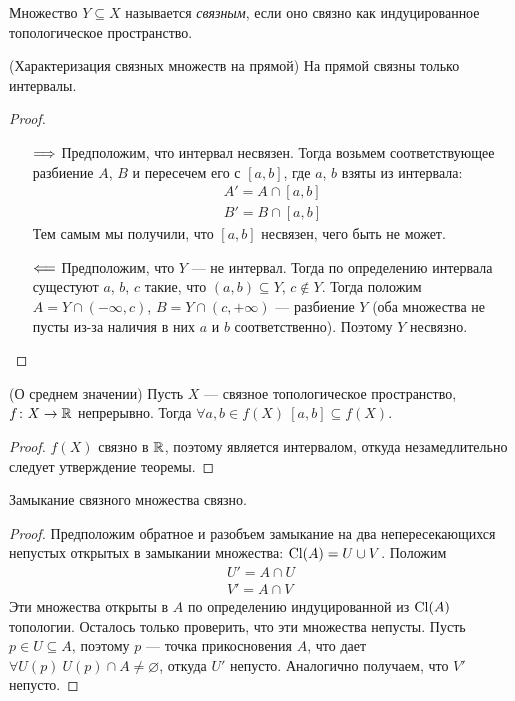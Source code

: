 \begin{definition}
	Множество $Y \subseteq X$ называется \textit{связным}, если оно связно как
	индуцированное топологическое пространство.
\end{definition}

\begin{theorem}(Характеризация связных множеств на прямой)
	На прямой связны только интервалы.
\end{theorem}
\begin{proof}
	\enewline
	\begin{itemize}
		\item[$\Longrightarrow$] Предположим, что интервал несвязен. Тогда
			возьмем соответствующее разбиение $A$, $B$ и пересечем его с
			$[a, b]$, где $a$, $b$ взяты из интервала:
\begin{align*}
	A' = A \cap [a, b] \\
	B' = B \cap [a, b]
\end{align*}
			Тем самым мы получили, что $[a, b]$ несвязен, чего быть не может.
		\item[$\Longleftarrow$] Предположим, что $Y$ --- не интервал. Тогда по определению
			интервала сущестуют $a$, $b$, $c$ такие, что $(a, b) \subseteq Y$, $c \notin Y$.
			Тогда положим $A = Y \cap (-\infty, c)$, $B = Y \cap (c, +\infty)$ --- разбиение
			$Y$ (оба множества не пусты из-за наличия в них $a$ и $b$ соответственно). 
			Поэтому $Y$ несвязно.
	\end{itemize}
\end{proof}

\begin{theorem}(О среднем значении)
	Пусть $X$ --- связное топологическое пространство, $f \colon X \to \mathbb{R}$ непрерывно.
	Тогда $\forall a, b \in f(X)~ [a, b] \subseteq f(X)$.
\end{theorem}
\begin{proof}
	$f(X)$ связно в $\mathbb{R}$, поэтому является интервалом, откуда незамедлительно
	следует утверждение теоремы.
\end{proof}

\begin{lemma}
	Замыкание связного множества связно.
\end{lemma}
\begin{proof}
	Предположим обратное и разобъем замыкание на два непересекающихся непустых
	открытых в замыкании множества: $\operatorname{Cl}(A) = U \cup V$. Положим
\begin{align*}
	U' = A \cap U \\
	V' = A \cap V
\end{align*}
	Эти множества открыты в $A$ по определению индуцированной из $\operatorname{Cl}(A)$ топологии.
	Осталось только проверить, что эти множества непусты. Пусть $p \in U \subseteq A$,
	поэтому $p$ --- точка прикосновения $A$, что дает $\forall U(p)~ U(p) \cap A \neq 
	\varnothing$, откуда $U'$ непусто. Аналогично получаем, что $V'$ непусто.
\end{proof}

